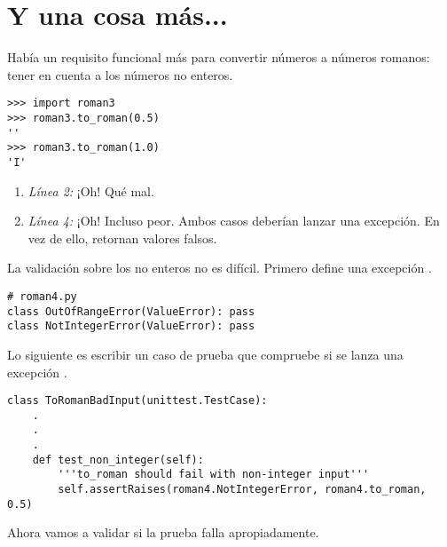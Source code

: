 \section{Y una cosa más...}

Había un requisito funcional más para convertir números a números romanos: tener en cuenta a los números no enteros.

\noindent\begin{minipage}{\textwidth}
\begin{lstlisting}[mathescape=True]
>>> import roman3
>>> roman3.to_roman(0.5)
''
>>> roman3.to_roman(1.0)
'I'
\end{lstlisting}
\end{minipage}

\begin{enumerate}

\item \emph{Línea 2:} ¡Oh! Qué mal.

\item \emph{Línea 4:} ¡Oh! Incluso peor. Ambos casos deberían lanzar una excepción. En vez de ello, retornan valores falsos.

\end{enumerate}

La validación sobre los no enteros no es difícil. Primero  define una excepción .

\noindent\begin{minipage}{\textwidth}
\begin{lstlisting}[mathescape=True]
# roman4.py
class OutOfRangeError(ValueError): pass
class NotIntegerError(ValueError): pass
\end{lstlisting}
\end{minipage}

Lo siguiente es escribir un caso de prueba que compruebe si se lanza una excepción .

\noindent\begin{minipage}{\textwidth}
\begin{lstlisting}[mathescape=True]
class ToRomanBadInput(unittest.TestCase):
    .
    .
    .
    def test_non_integer(self):
        '''to_roman should fail with non-integer input'''
        self.assertRaises(roman4.NotIntegerError, roman4.to_roman, 0.5)
\end{lstlisting}
\end{minipage}

Ahora vamos a validar si la prueba falla apropiadamente.

